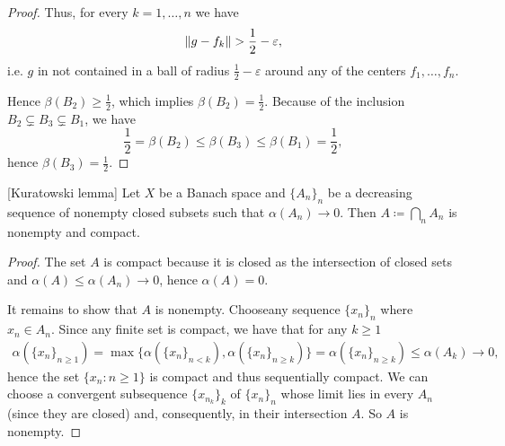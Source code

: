 \begin{proof}
  Thus, for every \( k = 1, \ldots, n \) we have
  \begin{equation*}
    \left\Vert g - f_k \right\Vert > \frac 1 2 - \varepsilon,
  \end{equation*}
  i.e. \( g \) in not contained in a ball of radius \( \frac 1 2 - \varepsilon \) around any of the centers \( f_1, \ldots, f_n \).

  Hence \( \beta(B_2) \geq \frac 1 2 \), which implies \( \beta(B_2) = \frac 1 2 \). Because of the inclusion \( B_2 \subsetneq B_3 \subsetneq B_1 \), we have
  \begin{equation*}
    \frac 1 2 = \beta(B_2) \leq \beta(B_3) \leq \beta(B_1) = \frac 1 2,
  \end{equation*}
  hence \( \beta(B_3) = \frac 1 2 \).
\end{proof}

\begin{theorem}\label{thm:noncompact_kuratowski_lemma}[Kuratowski lemma]\cite[exercise 7.4]{Deimling1985}
  Let \( X \) be a Banach space and \( \{ A_n \}_n \) be a decreasing sequence of nonempty closed subsets such that \( \alpha(A_n) \to 0 \). Then \( A \coloneqq \bigcap_n A_n \) is nonempty and compact.
\end{theorem}
\begin{proof}
  The set \( A \) is compact because it is closed as the intersection of closed sets and \( \alpha(A) \leq \alpha(A_n) \to 0 \), hence \( \alpha(A) = 0 \).

  It remains to show that \( A \) is nonempty.
  Choose\AOC any sequence \( \{ x_n \}_n \) where \( x_n \in A_n \). Since any finite set is compact, we have that for any \( k \geq 1 \)
  \begin{align*}
    \alpha(\{ x_n \}_{n \geq 1})
    =
    \max\{ \alpha(\{ x_n \}_{n < k}), \alpha(\{ x_n \}_{n \geq k}) \}
    =
    \alpha(\{ x_n \}_{n \geq k})
    \leq
    \alpha(A_k) \to 0,
  \end{align*}
  hence the set \( \{ x_n \colon n \geq 1 \} \) is compact and thus sequentially compact. We can choose a convergent subsequence \( \{ x_{n_k} \}_k \) of \( \{ x_n \}_n \) whose limit lies in every \( A_n \) (since they are closed) and, consequently, in their intersection \( A \). So \( A \) is nonempty.
\end{proof}
